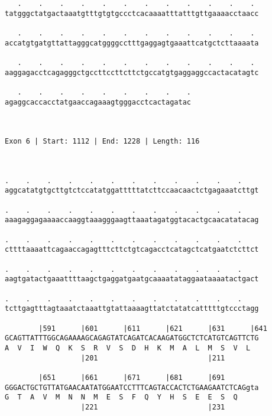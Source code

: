 \documentclass{article}
\begin{document}
\begin{Verbatim}
   .    .    .    .    .    .    .    .    .    .    .    . 
tatgggctatgactaaatgtttgtgtgccctcacaaaatttatttgttgaaaacctaacc
                                                            
   .    .    .    .    .    .    .    .    .    .    .    . 
accatgtgatgttattagggcatggggcctttgaggagtgaaattcatgctcttaaaata
                                                            
   .    .    .    .    .    .    .    .    .    .    .    . 
aaggagacctcagagggctgccttccttcttctgccatgtgaggaggccactacatagtc
                                                            
   .    .    .    .    .    .    .    .    .
agaggcaccacctatgaaccagaaagtgggacctcactagatac
                                            
                                            
 
Exon 6 | Start: 1112 | End: 1228 | Length: 116



.    .    .    .    .    .    .    .    .    .    .    .    
aggcatatgtgcttgtctccatatggatttttatcttccaacaactctgagaaatcttgt
                                                            
.    .    .    .    .    .    .    .    .    .    .    .    
aaagaggagaaaaccaaggtaaagggaagttaaatagatggtacactgcaacatatacag
                                                            
.    .    .    .    .    .    .    .    .    .    .    .    
cttttaaaattcagaaccagagtttcttctgtcagacctcatagctcatgaatctcttct
                                                            
.    .    .    .    .    .    .    .    .    .    .    .    
aagtgatactgaaattttaagctgaggatgaatgcaaaatataggaataaaatactgact
                                                            
.    .    .    .    .    .    .    .    .    .    .    .    
tcttgagtttagtaaatctaaattgtattaaaagttatctatatcatttttgtccctagg
                                                            
        |591      |601      |611      |621      |631      |641
GCAGTTATTTGGCAGAAAAGCAGAGTATCAGATCACAAGATGGCTCTCATGTCAGTTCTG
A  V  I  W  Q  K  S  R  V  S  D  H  K  M  A  L  M  S  V  L  
                  |201                          |211        
  
        |651      |661      |671      |681      |691        
GGGACTGCTGTTATGAACAATATGGAATCCTTTCAGTACCACTCTGAAGAATCTCAGgta
G  T  A  V  M  N  N  M  E  S  F  Q  Y  H  S  E  E  S  Q     
                  |221                          |231        
  

\end{Verbatim}
\end{document}
